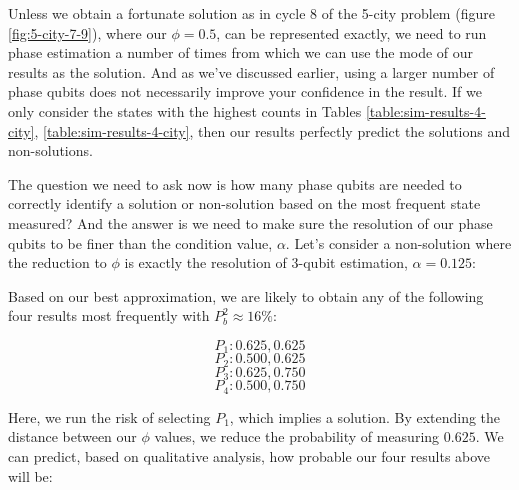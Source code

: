 \documentclass[msc,oneside]{ubcthesis}
\begin{document}
Unless we obtain a fortunate solution as in cycle 8 of the 5-city problem (figure \ref{fig:5-city-7-9}), where our $\phi = 0.5$, can be represented exactly, we need to run phase estimation a number of times from which we can use the mode of our results as the solution. And as we've discussed earlier, using a larger number of phase qubits does not necessarily improve your confidence in the result. If we only consider the states with the highest counts in Tables \ref{table:sim-results-4-city}, \ref{table:sim-results-4-city}, then our results perfectly predict the solutions and non-solutions.
	
The question we need to ask now is how many phase qubits are needed to correctly identify a solution or non-solution based on the most frequent state measured? And the answer is we need to make sure the resolution of our phase qubits to be finer than the condition value, $\alpha$. Let's consider a non-solution where the reduction to $\phi$ is exactly the resolution of 3-qubit estimation, $\alpha = 0.125$:
	
	
	
	
	Based on our best approximation, we are likely to obtain any of the following four results most frequently with $P^2_b \approx 16\%$:

	$$P_1: 0.625, 0.625$$
	$$P_2: 0.500, 0.625$$
	$$P_3: 0.625, 0.750$$
	$$P_4: 0.500, 0.750$$
	
	Here, we run the risk of selecting $P_1$, which implies a solution. By extending the distance between our $\phi$ values, we reduce the probability of measuring $0.625$. We can predict, based on qualitative analysis, how probable our four results above will be:
	
	
\end{document}
